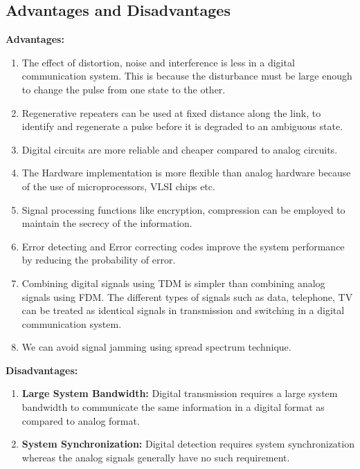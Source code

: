\subsection{Advantages and Disadvantages}

\textbf{Advantages:}

\begin{enumerate}

  \item The effect of distortion, noise and interference is less in a digital
  communication system. This is because the disturbance must be large enough to
  change the pulse from one state to the other.

  \item Regenerative repeaters can be used at fixed distance along the link, to
  identify and regenerate a pulse before it is degraded to an ambiguous state.

  \item Digital circuits are more reliable and cheaper compared to analog
  circuits.

  \item The Hardware implementation is more flexible than analog hardware because
  of the use of microprocessors, VLSI chips etc.

  \item Signal processing functions like encryption, compression can be employed
  to maintain the secrecy of the information.

  \item Error detecting and Error correcting codes improve the system performance
  by reducing the probability of error.

  \item Combining digital signals using TDM is simpler than combining analog
  signals using FDM. The different types of signals such as data, telephone, TV
  can be treated as identical signals in transmission and switching in a digital
  communication system.

  \item We can avoid signal jamming using spread spectrum technique.

\end{enumerate}

\textbf{Disadvantages:}

\begin{enumerate}

  \item \textbf{Large System Bandwidth:} Digital transmission requires a large system
  bandwidth to communicate the same information in a digital format as compared to
  analog format.

  \item \textbf{System Synchronization:} Digital detection requires system synchronization
  whereas the analog signals generally have no such requirement.

\end{enumerate}

